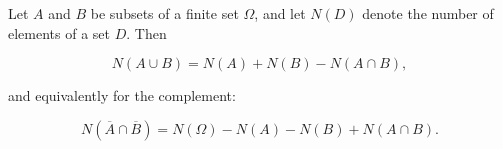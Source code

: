 Let $A$ and $B$ be subsets of a finite set $\Omega$, and let $N(D)$ denote the number of elements of a set $D$. Then

$$N(A \cup B) = N(A) + N(B) - N(A \cap B),$$

and equivalently for the complement:

$$N(\overline{A} \cap \overline{B}) = N(\Omega) - N(A) - N(B) + N(A \cap B).$$
